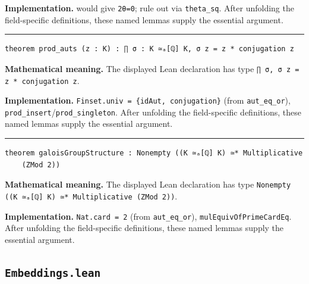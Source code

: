\documentclass[UTF8,a4paper,11pt,fontset=fandol]{ctexart}
\theoremstyle{definition}
\newcommand{\statementsep}{\par\medskip\hrule\medskip}
\begin{document}
\noindent\textbf{Implementation.} would give \texttt{2θ=0}; rule out via \texttt{theta\_\allowbreak{}sq}. After unfolding the field-specific definitions, these named lemmas supply the essential argument.\par
\statementsep
\begin{verbatim}
theorem prod_auts (z : K) : ∏ σ : K ≃ₐ[ℚ] K, σ z = z * conjugation z
\end{verbatim}
\noindent\textbf{Mathematical meaning.} The displayed Lean declaration has type \texttt{∏ σ, σ z = z * conjugation z}.\par
\noindent\textbf{Implementation.} \texttt{Finset.\allowbreak{}univ = \{idAut, conjugation\}} (from \texttt{aut\_\allowbreak{}eq\_\allowbreak{}or}), \texttt{prod\_\allowbreak{}insert}/\texttt{prod\_\allowbreak{}singleton}. After unfolding the field-specific definitions, these named lemmas supply the essential argument.\par
\statementsep
\begin{verbatim}
theorem galoisGroupStructure : Nonempty ((K ≃ₐ[ℚ] K) ≃* Multiplicative
    (ZMod 2))
\end{verbatim}
\noindent\textbf{Mathematical meaning.} The displayed Lean declaration has type \texttt{Nonempty ((K ≃ₐ[ℚ] K) ≃* Multiplicative (ZMod 2))}.\par
\noindent\textbf{Implementation.} \texttt{Nat.\allowbreak{}card = 2} (from \texttt{aut\_\allowbreak{}eq\_\allowbreak{}or}), \texttt{mulEquivOfPrimeCardEq}. After unfolding the field-specific definitions, these named lemmas supply the essential argument.\par

\subsection{\texttt{Embeddings.lean}}
\end{document}

